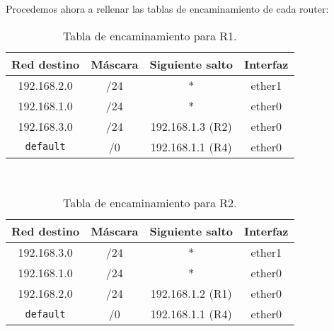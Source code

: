 \begin{ejercicio}
    Procedemos ahora a rellenar las tablas de encaminamiento de cada router:
    \begin{table}
    \centering
    \begin{tabular}{|c|c|c|c|}
        \hline
        Red destino & Máscara & Siguiente salto & Interfaz \\
        \hline
        192.168.2.0 & /24 & * & ether1 \\
        \hline
        192.168.1.0 & /24 & * & ether0 \\
        \hline
        192.168.3.0 & /24 & 192.168.1.3 (R2) & ether0 \\
        \hline
        \verb|default| & /0 & 192.168.1.1 (R4) & ether0 \\
        \hline
    \end{tabular}\\
    \caption{Tabla de encaminamiento para R1.}
    \end{table}

    \begin{table}
        \centering
        \begin{tabular}{|c|c|c|c|}
            \hline
            Red destino & Máscara & Siguiente salto & Interfaz \\
            \hline
            192.168.3.0 & /24 & * & ether1 \\
            \hline
            192.168.1.0 & /24 & * & ether0 \\
            \hline
            192.168.2.0 & /24 & 192.168.1.2 (R1) & ether0 \\
            \hline
            \verb|default| & /0 & 192.168.1.1 (R4) & ether0 \\
            \hline
        \end{tabular}\\
        \caption{Tabla de encaminamiento para R2.}
        \end{table}


\end{ejercicio}
